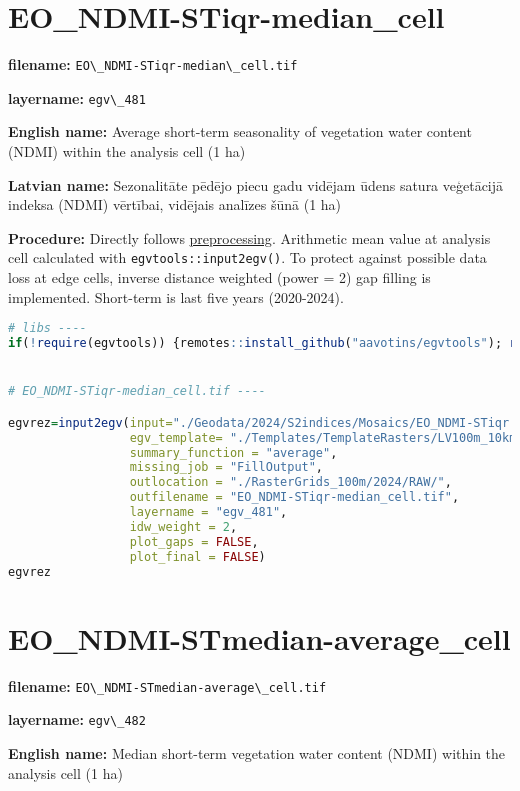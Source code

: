 \documentclass[
]{book}
\newcommand{\passthrough}[1]{#1}
\begin{document}
\section{EO\_NDMI-STiqr-median\_cell}\label{ch06.481}

\textbf{filename:} \passthrough{\lstinline!EO\_NDMI-STiqr-median\_cell.tif!}

\textbf{layername:} \passthrough{\lstinline!egv\_481!}

\textbf{English name:} Average short-term seasonality of vegetation water content (NDMI) within the analysis cell (1 ha)

\textbf{Latvian name:} Sezonalitāte pēdējo piecu gadu vidējam ūdens satura veģetācijā indeksa (NDMI) vērtībai, vidējais analīzes šūnā (1 ha)

\textbf{Procedure:} Directly follows \hyperref[Ch04.13]{preprocessing}. Arithmetic mean value at analysis cell
calculated with \passthrough{\lstinline!egvtools::input2egv()!}. To protect against possible data loss at edge cells,
inverse distance weighted (power = 2) gap filling is implemented. Short-term is last five years (2020-2024).

\begin{lstlisting}[language=R]
# libs ----
if(!require(egvtools)) {remotes::install_github("aavotins/egvtools"); require(egvtools)}


# EO_NDMI-STiqr-median_cell.tif ----

egvrez=input2egv(input="./Geodata/2024/S2indices/Mosaics/EO_NDMI-STiqr.tif",
                 egv_template= "./Templates/TemplateRasters/LV100m_10km.tif",
                 summary_function = "average",
                 missing_job = "FillOutput",
                 outlocation = "./RasterGrids_100m/2024/RAW/",
                 outfilename = "EO_NDMI-STiqr-median_cell.tif",
                 layername = "egv_481",
                 idw_weight = 2,
                 plot_gaps = FALSE,
                 plot_final = FALSE)
egvrez
\end{lstlisting}

\section{EO\_NDMI-STmedian-average\_cell}\label{ch06.482}

\textbf{filename:} \passthrough{\lstinline!EO\_NDMI-STmedian-average\_cell.tif!}

\textbf{layername:} \passthrough{\lstinline!egv\_482!}

\textbf{English name:} Median short-term vegetation water content (NDMI) within the analysis cell (1 ha)
\end{document}
